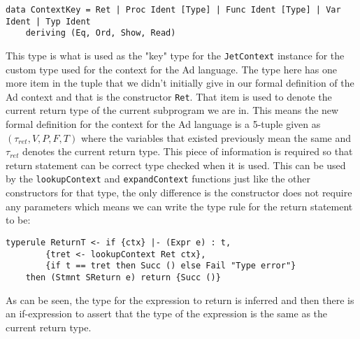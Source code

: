 \begin{lstlisting}[numbers=none]
data ContextKey = Ret | Proc Ident [Type] | Func Ident [Type] | Var Ident | Typ Ident
    deriving (Eq, Ord, Show, Read)
\end{lstlisting}
This type is what is used as the "key" type for the \texttt{JetContext} instance for the custom type used for the context for the Ad language.
The type here has one more item in the tuple that we didn't initially give in our formal definition of the Ad context and that is the constructor \texttt{Ret}.
That item is used to denote the current return type of the current subprogram we are in.
This means the new formal definition for the context for the Ad language is a 5-tuple given as $(\tau_{ret}, V, P, F, T)$ where the variables that existed previously mean the same and $\tau_{ret}$ denotes the current return type.
This piece of information is required so that return statement can be correct type checked when it is used.
This can be used by the \texttt{lookupContext} and \texttt{expandContext} functions just like the other constructors for that type, the only difference is the constructor does not require any parameters which means we can write the type rule for the return statement to be:
\begin{lstlisting}
typerule ReturnT <- if {ctx} |- (Expr e) : t, 
        {tret <- lookupContext Ret ctx}, 
        {if t == tret then Succ () else Fail "Type error"} 
    then (Stmnt SReturn e) return {Succ ()} 
\end{lstlisting}
As can be seen, the type for the expression to return is inferred and then there is an if-expression to assert that the type of the expression is the same as the current return type.
